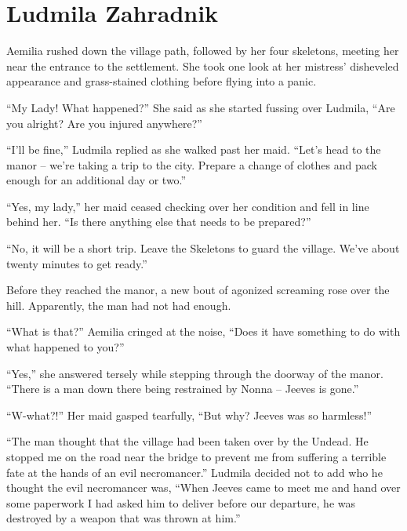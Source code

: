 \chapter{Ludmila Zahradnik}

Aemilia rushed down the village path, followed by her four skeletons, meeting her near the entrance to the settlement. She took one look at her mistress’ disheveled appearance and grass-stained clothing before flying into a panic.

 

“My Lady! What happened?” She said as she started fussing over Ludmila, “Are you alright? Are you injured anywhere?”

 

“I’ll be fine,” Ludmila replied as she walked past her maid. “Let’s head to the manor – we’re taking a trip to the city. Prepare a change of clothes and pack enough for an additional day or two.”

 

“Yes, my lady,” her maid ceased checking over her condition and fell in line behind her. “Is there anything else that needs to be prepared?”

 

“No, it will be a short trip. Leave the Skeletons to guard the village. We’ve about twenty minutes to get ready.”

 

Before they reached the manor, a new bout of agonized screaming rose over the hill. Apparently, the man had not had enough.

 

“What is that?” Aemilia cringed at the noise, “Does it have something to do with what happened to you?”

 

“Yes,” she answered tersely while stepping through the doorway of the manor. “There is a man down there being restrained by Nonna – Jeeves is gone.”

 

“W-what?!” Her maid gasped tearfully, “But why? Jeeves was so harmless!”

 

“The man thought that the village had been taken over by the Undead. He stopped me on the road near the bridge to prevent me from suffering a terrible fate at the hands of an evil necromancer.” Ludmila decided not to add who he thought the evil necromancer was, “When Jeeves came to meet me and hand over some paperwork I had asked him to deliver before our departure, he was destroyed by a weapon that was thrown at him.”

